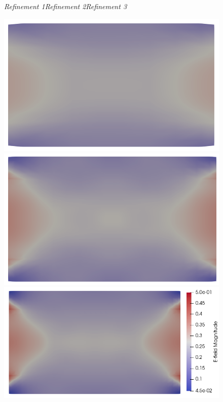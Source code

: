 \documentclass{article}
\begin{document}
\begin{figure}
    \centering
    \textit{\textsf{Refinement 1\hspace{2.5cm}Refinement 2\hspace{2.5cm}Refinement 3\hspace{1cm}}}
    
    \includegraphics[scale=0.27]{clip_E_T-1_lambda-1e-1_8-2-2.png}
    \includegraphics[scale=0.27]{clip_E_T-1_lambda-1e-1_16-3-3.png}
    \includegraphics[scale=0.27]{clip_E_T-1_lambda-1e-1_32-3-4.png}

\end{figure}
\end{document}

